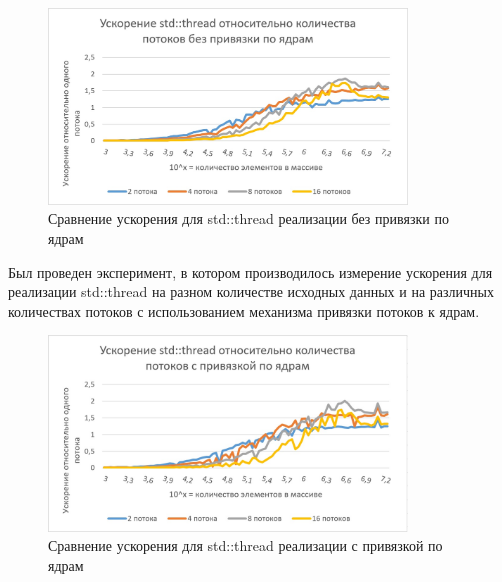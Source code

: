 \documentclass{report}
\begin{document}
\begin{figure}[H]
    \centering
    \includegraphics[width=0.85\textwidth]{../modules/task_1/ivanov_arkady_rbms/images/boost_std_without_affinity.jpg}
    \caption{Сравнение ускорения для std::thread реализации без привязки по ядрам}
    \label{fig:my_label_5}
\end{figure}
\par Был проведен эксперимент, в котором производилось измерение ускорения для реализации std::thread на разном количестве исходных данных и на различных количествах потоков с использованием механизма привязки потоков к ядрам.
\begin{figure}[H]
    \centering
    \includegraphics[width=0.85\textwidth]{../modules/task_1/ivanov_arkady_rbms/images/boost_std_with_affinity.jpg}
    \caption{Сравнение ускорения для std::thread реализации с привязкой по ядрам}
    \label{fig:my_label_6}
\end{figure}

\newpage

\end{document}
